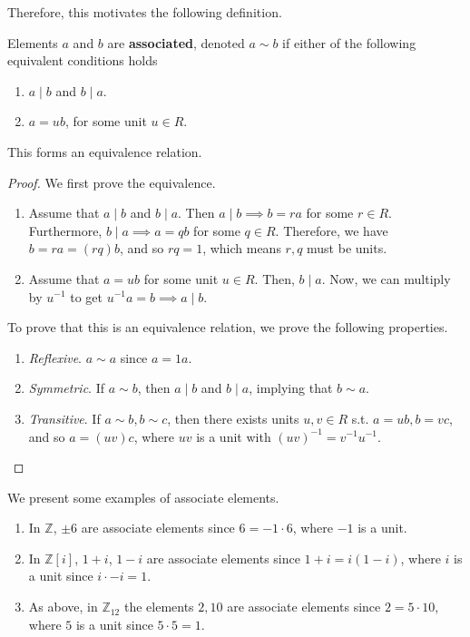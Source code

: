   Therefore, this motivates the following definition. 

  \begin{definition}
    Elements $a$ and $b$ are \textbf{associated}, denoted $a \sim b$ if either of the following equivalent conditions holds
    \begin{enumerate}
      \item $a \mid b$ and $b \mid a$. 
      \item $a = u b$, for some unit $u \in R$. 
    \end{enumerate}
    This forms an equivalence relation. 
  \end{definition} 
  \begin{proof}
    We first prove the equivalence. 
    \begin{enumerate}
      \item Assume that $a \mid b$ and $b \mid a$. Then $a \mid b \implies b = ra$ for some $r \in R$. Furthermore, $b \mid a \implies a = qb$ for some $q \in R$. Therefore, we have $b = ra = (rq)b$, and so $rq = 1$, which means $r, q$ must be units. 
      \item Assume that $a = ub$ for some unit $u \in R$. Then, $b \mid a$. Now, we can multiply by $u^{-1}$ to get $u^{-1} a = b \implies a \mid b$. 
    \end{enumerate}
    To prove that this is an equivalence relation, we prove the following properties. 
    \begin{enumerate}
      \item \textit{Reflexive}. $a \sim a$ since $a = 1a$. 
      \item \textit{Symmetric}. If $a \sim b$, then $a \mid b$ and $b \mid a$, implying that $b \sim a$. 
      \item \textit{Transitive}. If $a \sim b, b \sim c$, then there exists units $u, v \in R$ s.t. $a = ub, b = vc$, and so $a = (uv)c$, where $uv$ is a unit with $(uv)^{-1} = v^{-1} u^{-1}$. 
    \end{enumerate}
  \end{proof}

  \begin{example}
    We present some examples of associate elements. 
    \begin{enumerate}
      \item In $\mathbb{Z}$, $\pm 6$ are associate elements since $6 = -1 \cdot 6$, where $-1$ is a unit. 
      \item In $\mathbb{Z}[i]$, $1 + i$, $1 - i$ are associate elements since $1 + i = i (1 - i)$, where $i$ is a unit since $i \cdot -i = 1$. 
      \item As above, in $\mathbb{Z}_{12}$ the elements $2, 10$ are associate elements since $2 = 5 \cdot 10$, where $5$ is a unit since $5 \cdot 5 = 1$. 
    \end{enumerate}
  \end{example}

